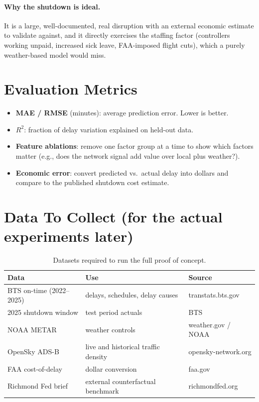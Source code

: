 \documentclass[11pt]{article}
\begin{document}
\paragraph{Why the shutdown is ideal.} It is a large, well-documented, real
disruption with an external economic estimate to validate against, and it
directly exercises the staffing factor (controllers working unpaid, increased
sick leave, FAA-imposed flight cuts), which a purely weather-based model would
miss.

\section{Evaluation Metrics}
\begin{itemize}
  \item \textbf{MAE / RMSE} (minutes): average prediction error. Lower is better.
  \item \textbf{$R^2$}: fraction of delay variation explained on held-out data.
  \item \textbf{Feature ablations}: remove one factor group at a time to show
        which factors matter (e.g., does the network signal add value over local
        plus weather?).
  \item \textbf{Economic error}: convert predicted vs.\ actual delay into dollars
        and compare to the published shutdown cost estimate.
\end{itemize}

\section{Data To Collect (for the actual experiments later)}
\begin{table}[h]
\centering
\small
\caption{Datasets required to run the full proof of concept.}
\begin{tabular}{>{\raggedright}p{3.6cm} >{\raggedright}p{5.2cm} p{3.4cm}}
\toprule
\textbf{Data} & \textbf{Use} & \textbf{Source} \\
\midrule
BTS on-time (2022--2025) & delays, schedules, delay causes & transtats.bts.gov \\
2025 shutdown window & test period actuals & BTS \\
NOAA METAR & weather controls & weather.gov / NOAA \\
OpenSky ADS-B & live and historical traffic density & opensky-network.org \\
FAA cost-of-delay & dollar conversion & faa.gov \\
Richmond Fed brief & external counterfactual benchmark & richmondfed.org \\
\bottomrule
\end{tabular}
\end{table}
\end{document}
